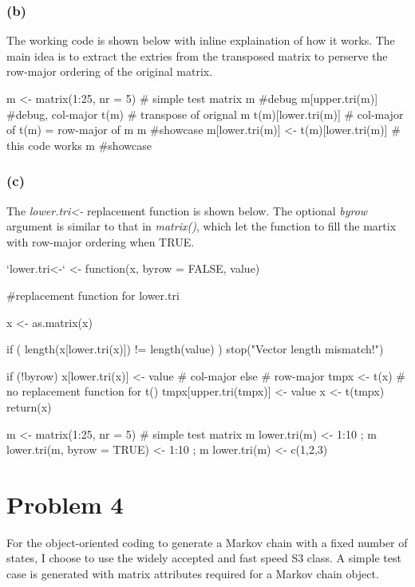 \documentclass{article}
\begin{document}
\subsubsection*{(b)}
The working code is shown below with inline explaination of how it works. The main idea is to extract the 
extries from the transposed matrix to perserve the row-major ordering of the original matrix.

m <- matrix(1:25, nr = 5) # simple test matrix
m #debug
m[upper.tri(m)] #debug, col-major
t(m) # transpose of orignal m
t(m)[lower.tri(m)] # col-major of t(m) = row-major of m
m #showcase
m[lower.tri(m)] <- t(m)[lower.tri(m)] # this code works
m #showcase

\subsubsection*{(c)}
The \textit{lower.tri<-} replacement function is shown below. The optional \textit{byrow} argument is 
similar to that in \textit{matrix()}, which let the function to fill the martix with row-major ordering when TRUE.

`lower.tri<-` <- function(x, byrow = FALSE, value){ 
    #replacement function for lower.tri
    
    x <- as.matrix(x)
    
    if ( length(x[lower.tri(x)]) != length(value) ) 
      stop("Vector length mismatch!")
	
    if (!byrow)	x[lower.tri(x)] <- value # col-major
    else { # row-major
        tmpx <- t(x) # no replacement function for t()
        tmpx[upper.tri(tmpx)] <- value
        x <- t(tmpx)
    }
    return(x)
}

m <- matrix(1:25, nr = 5) # simple test matrix
m
lower.tri(m) <- 1:10 ; 	m
lower.tri(m, byrow = TRUE) <- 1:10 ; m
lower.tri(m) <- c(1,2,3)


\newpage
\section*{Problem 4}
For the object-oriented coding to generate a Markov chain with a fixed number of states, I choose to use the 
widely accepted and fast speed S3 class. A simple test case is generated with matrix attributes required for a 
Markov chain object.
\end{document}
